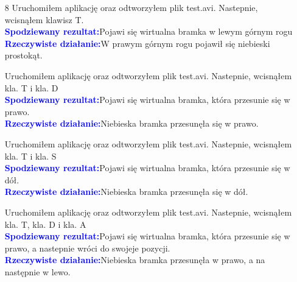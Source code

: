 \documentclass[11pt,a4paper]{article}
\newcommand{\testA}{\textcolor{blue}{\textbf{Spodziewany rezultat:\quad}}}
\newcommand{\testB}{\textcolor{blue}{\textbf{Rzeczywiste działanie:\quad}}}
\newcommand{\testT}{\textcolor{green}{\large{\textbf{TEST ZALICZONY}}}}
\begin{document}
\begin{enumerate}
Uruchomiłem aplikację oraz odtworzyłem plik test.avi. Nastepnie, wcisnąłem p.(14), p.(11) i p(9)\\
\testA Pojawi się wirtualna bramka, która przesunie się w prawo, a nastepnie wróci do swojeje pozycji.\\
\testB Niebieska bramka przesunęła w prawo, a na następnie w lewo.

Uruchomiłem aplikację oraz odtworzyłem plik test.avi. Nastepnie, wcisnąłem p.(14), p.(10) i p(13)\\
\testA Pojawi się wirtualna bramka, która przesunie się w dół, a nastepnie wróci do swojeje pozycji.\\
\testB Niebieska bramka przesunęła w dół,a  na następnie w górę.

Uruchomiłem aplikację oraz odtworzyłem plik test.avi. Nastepnie, wcisnąłem p.(14) i p.(12)\\
\testA Pojawi się wirtualna bramka, która obróci się o 90 stopni.\\
\testB Niebieska bramka z pozycji horyzontalnej przeszła w pozycję pionową.

\testT


\item[8] Uruchomiłem aplikację oraz odtworzyłem plik test.avi. Nastepnie, wcisnąłem klawisz T.\\
\testA  Pojawi  się wirtualna bramka w lewym górnym rogu\\
\testB W prawym górnym rogu pojawił się niebieski prostokąt.

Uruchomiłem aplikację oraz odtworzyłem plik test.avi. Nastepnie, wcisnąłem kla. T  i kla. D\\
\testA Pojawi się wirtualna bramka, która przesunie się w prawo.\\
\testB Niebieska bramka przesunęła się w prawo.

Uruchomiłem aplikację oraz odtworzyłem plik test.avi. Nastepnie, wcisnąłem kla. T i kla. S\\
\testA Pojawi się wirtualna bramka, która przesunie się w dół.\\
\testB Niebieska bramka przesunęła się w dół.

Uruchomiłem aplikację oraz odtworzyłem plik test.avi. Nastepnie, wcisnąłem kla. T, kla. D i kla. A\\
\testA Pojawi się wirtualna bramka, która przesunie się w prawo, a nastepnie wróci do swojeje pozycji.\\
\testB Niebieska bramka przesunęła w prawo, a na następnie w lewo.


\end{enumerate}
\end{document}
